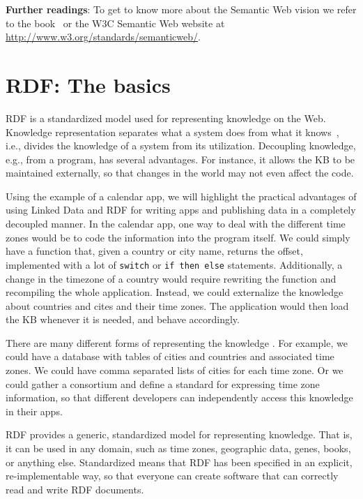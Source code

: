 \medskip

\textbf{Further readings}:
To get to know more about the Semantic Web vision we refer to the book~\cite{swbook} or the W3C Semantic Web website at \url{http://www.w3.org/standards/semanticweb/}.

\section{RDF: The basics}
\label{rdf}

\ac{RDF} is a standardized model used for representing knowledge on the Web.
Knowledge representation separates what a system does from what it knows~\cite{brachmannKR}, i.e., divides the knowledge of a system from its utilization.
Decoupling knowledge, e.g., from a program, has several advantages.
For instance, it allows the \ac{KB} to be maintained externally, so that changes in the world may not even affect the code.

Using the example of a calendar app, we will highlight the practical advantages of using Linked Data and \ac{RDF} for writing apps and publishing data in a completely decoupled manner.
In the calendar app, one way to deal with the different time zones would be to code the information into the program itself. 
We could simply have a function that, given a country or city name, returns the offset, implemented with a lot of \texttt{switch} or \texttt{if then else} statements.
Additionally, a change in the timezone of a country would require rewriting the function and recompiling the whole application.
Instead, we could externalize the knowledge about countries and cites and their time zones.
The application would then load the \ac{KB} whenever it is needed, and behave accordingly.

There are many different forms of representing the knowledge .
For example, we could have a database with tables of cities and countries and associated time zones.
We could have comma separated lists of cities for each time zone.
Or we could gather a consortium and define a standard for expressing time zone information, so that different developers can independently access this knowledge in their apps.%

\ac{RDF} provides a generic, standardized model for representing knowledge.
That is, it can be used in any domain, such as time zones, geographic data, genes, books, or anything else.
Standardized means that \ac{RDF} has been specified in an explicit, re-implementable way, so that everyone can create software that can correctly read and write \ac{RDF} documents.

